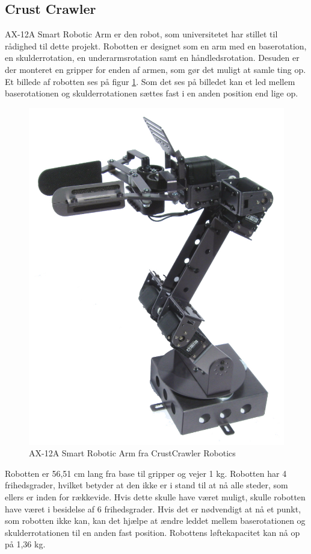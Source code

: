 \subsection{Crust Crawler} %
\label{sub:crust_crawler}

AX-12A Smart Robotic Arm er den robot, som universitetet har stillet til rådighed til dette projekt. Robotten er designet som en arm med en baserotation, en skulderrotation, en underarmsrotation samt en håndledsrotation. Desuden er der monteret en gripper for enden af armen, som gør det muligt at samle ting op. Et billede af robotten ses på figur \ref{fig:crustcrawler}. Som det ses på billedet kan et led mellem baserotationen og skulderrotationen sættes fast i en anden position end lige op. \\


\begin{figure}[h]
\centering
\includegraphics[scale=0.45]{images/crustCrawler}
\caption{AX-12A Smart Robotic Arm fra CrustCrawler Robotics}
\label{fig:crustcrawler}
\end{figure}

Robotten er 56,51 cm lang fra base til gripper og vejer 1 kg. Robotten har 4 frihedsgrader, hvilket betyder at den ikke er i stand til at nå alle steder, som ellers er inden for rækkevide. Hvis dette skulle have været muligt, skulle robotten have været i besidelse af 6 frihedsgrader. Hvis det er nødvendigt at nå et punkt, som robotten ikke kan, kan det hjælpe at ændre leddet mellem baserotationen og skulderrotationen til en anden fast position. Robottens løftekapacitet kan nå op på 1,36 kg.

